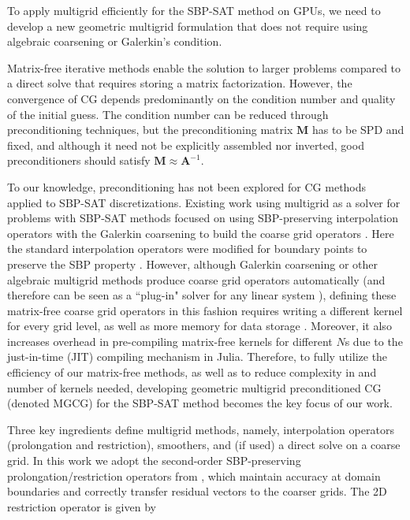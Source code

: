 
To apply multigrid efficiently for the SBP-SAT method on GPUs, we need to develop a new geometric multigrid formulation that does not require using algebraic coarsening or Galerkin's condition.

Matrix-free iterative methods enable the solution to larger problems compared to a direct solve that requires storing a matrix factorization.  However, the convergence of CG depends predominantly on the condition number and quality of the initial guess. The condition number can be reduced through preconditioning techniques, but the preconditioning matrix $\mathbf{M}$ has to be SPD and fixed, and although it need not be explicitly assembled nor inverted, good preconditioners should satisfy $\mathbf{M} \approx \mathbf{A}^{-1}$. 


To our knowledge, preconditioning has not been explored for CG methods applied to SBP-SAT discretizations. 
Existing work using multigrid as a solver for problems with SBP-SAT methods focused on using SBP-preserving interpolation operators with the Galerkin coarsening to build the coarse grid operators \cite{Ruggiu2018}. Here the standard interpolation operators were modified for boundary points to preserve the SBP property \cite{Ruggiu2018}. However, although Galerkin coarsening or other algebraic multigrid methods produce coarse grid operators automatically (and therefore can be seen as a ``plug-in" solver for any linear system \cite{stuben2001review}), defining these matrix-free coarse grid operators in this fashion requires writing a different kernel for every grid level, as well as more memory for data storage \cite{brandt2006guide}. 
Moreover, it also increases overhead in pre-compiling matrix-free kernels for different $N$s due to the just-in-time (JIT) compiling mechanism in Julia. Therefore, to fully utilize the efficiency of our matrix-free methods, as well as to reduce complexity in and number of kernels needed, developing geometric multigrid preconditioned CG (denoted MGCG) for the SBP-SAT method becomes the key focus of our work. 

Three key ingredients define multigrid methods, namely, interpolation operators (prolongation and restriction), smoothers, and (if used) a direct solve on a coarse grid.  In this work we adopt the second-order SBP-preserving prolongation/restriction operators from \cite{Ruggiu2018}, which maintain accuracy at domain boundaries and correctly transfer residual vectors to the coarser grids. The 2D restriction operator is given by

